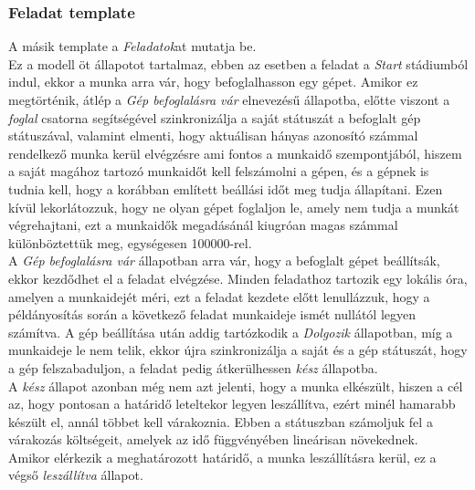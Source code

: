 \documentclass {report}
\begin{document}
    \subsubsection*{Feladat template}
    A másik template a \emph{Feladatok}at mutatja be.\\
    Ez a modell öt állapotot tartalmaz, ebben az esetben a feladat a \emph{Start} stádiumból indul, ekkor a munka arra vár, hogy befoglalhasson egy gépet. Amikor ez megtörténik, átlép a \emph{Gép befoglalásra vár} elnevezésű állapotba, előtte viszont a \emph{foglal} csatorna segítségével szinkronizálja a saját státuszát a befoglalt gép státuszával, valamint elmenti, hogy aktuálisan hányas azonosító számmal rendelkező munka kerül elvégzésre ami fontos a munkaidő szempontjából, hiszem a saját magához tartozó munkaidőt kell felszámolni a gépen, és a gépnek is tudnia kell, hogy a korábban említett beállási időt meg tudja állapítani. Ezen kívül lekorlátozzuk, hogy ne olyan gépet foglaljon le, amely nem tudja a munkát végrehajtani, ezt a munkaidők megadásánál kiugróan magas számmal különböztettük meg, egységesen 100000-rel. \\
    A \emph{Gép befoglalásra vár} állapotban arra vár, hogy a befoglalt gépet beállítsák, ekkor kezdődhet el a feladat elvégzése. Minden feladathoz tartozik egy lokális óra, amelyen a munkaidejét méri, ezt a feladat kezdete előtt lenullázzuk, hogy a példányosítás során a következő feladat munkaideje ismét nullától legyen számítva. A gép beállítása után addig tartózkodik a \emph{Dolgozik} állapotban, míg a munkaideje le nem telik, ekkor újra szinkronizálja a saját és a gép státuszát, hogy a gép felszabaduljon, a feladat pedig átkerülhessen \emph{kész} állapotba. \\
    A \emph{kész} állapot azonban még nem azt jelenti, hogy a munka elkészült, hiszen a cél az, hogy pontosan a határidő leteltekor legyen leszállítva, ezért minél hamarabb készült el, annál többet kell várakoznia. Ebben a státuszban számoljuk fel a várakozás költségeit, amelyek az idő függvényében lineárisan növekednek. \\
    Amikor elérkezik a meghatározott határidő, a munka leszállításra kerül, ez a végső \emph{leszállítva} állapot.  
\end{document}
